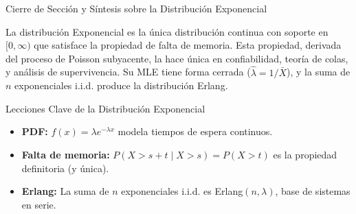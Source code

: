 \documentclass[10pt, aspectratio=169]{beamer}
\begin{document}





\begin{frame}{Cierre de Sección y Síntesis sobre la Distribución Exponencial}
  \begin{reflexion}
    La distribución Exponencial es la única distribución continua con soporte en $[0, \infty)$ que satisface la propiedad de falta de memoria. Esta propiedad, derivada del proceso de Poisson subyacente, la hace única en confiabilidad, teoría de colas, y análisis de supervivencia. Su MLE tiene forma cerrada ($\hat{\lambda} = 1/\bar{X}$), y la suma de $n$ exponenciales i.i.d. produce la distribución Erlang.
  \end{reflexion}

  \vspace{0.2cm}
  \pause
  \begin{block}{Lecciones Clave de la Distribución Exponencial}
    \begin{itemize}\itemsep=0.08cm
      \item \textbf{PDF:} $f(x) = \lambda e^{-\lambda x}$ modela tiempos de espera continuos.
      \item \textbf{Falta de memoria:} $P(X > s + t \mid X > s) = P(X > t)$ es la propiedad definitoria (y única).
      \item \textbf{Erlang:} La suma de $n$ exponenciales i.i.d. es Erlang$(n, \lambda)$, base de sistemas en serie.
    \end{itemize}
  \end{block}
\end{frame}
\end{document}
